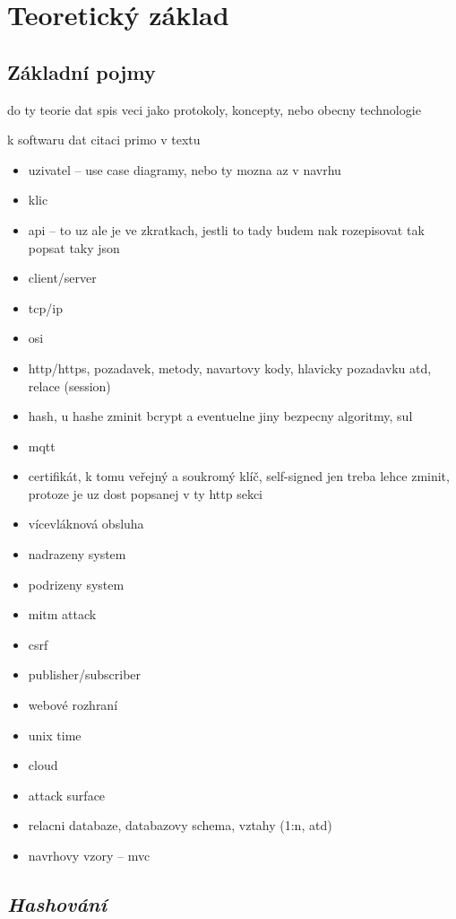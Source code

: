 \chapter{Teoretický základ}
\label{sec:te}

\section{Základní pojmy}

do ty teorie dat spis veci jako protokoly, koncepty, nebo obecny technologie

k softwaru dat citaci primo v textu

\begin{itemize}
    \item uzivatel -- use case diagramy, nebo ty mozna az v navrhu
    \item klic
    \item api -- to uz ale je ve zkratkach, jestli to tady budem nak rozepisovat tak popsat taky json
    \item client/server
    \item tcp/ip
    \item osi
    \item http/https, pozadavek, metody, navartovy kody, hlavicky pozadavku atd, relace (session)
    \item hash, u hashe zminit bcrypt a eventuelne jiny bezpecny algoritmy, sul
    \item mqtt
    \item certifikát, k tomu veřejný a soukromý klíč, self-signed jen treba lehce zminit, protoze je uz dost popsanej v ty http sekci
    \item vícevláknová obsluha
    \item nadrazeny system
    \item podrizeny system
    \item mitm attack
    \item csrf
    \item publisher/subscriber
    \item webové rozhraní
    \item unix time
    \item cloud
    \item attack surface
    \item relacni databaze, databazovy schema, vztahy (1:n, atd)
    \item navrhovy vzory -- mvc
\end{itemize}

\section{\textit{Hashování}}

